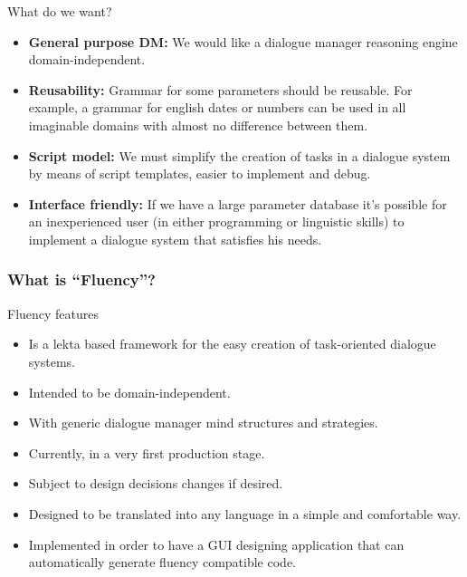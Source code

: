 \documentclass[11pt]{beamer}
\begin{document}
\begin{frame}
	\begin{block}{What do we want?}
			\begin{itemize}
				\item \textbf{General purpose DM:} We would like a dialogue manager reasoning engine domain-independent.
				\item \textbf{Reusability:} Grammar for some parameters should be reusable. For example, a grammar for english dates or numbers can be used in all imaginable domains with almost no difference between them.
				\item \textbf{Script model:} We must simplify the creation of tasks in a dialogue system by means of script templates, easier to implement and debug.
				\item \textbf{Interface friendly:} If we have a large parameter database it's possible for an inexperienced user (in either programming or linguistic skills) to implement a dialogue system that satisfies his needs.
			\end{itemize}
	\end{block}
\end{frame}

\begin{frame}
\frametitle{What is ``Fluency''?}
	\begin{block}{Fluency features}
			\begin{itemize}
				\item Is a lekta based framework for the easy creation of task-oriented dialogue systems.
				\item Intended to be domain-independent.
				\item With generic dialogue manager mind structures and strategies.
				\item Currently, in a very first production stage.
				\item Subject to design decisions changes if desired.
				\item Designed to be translated into any language in a simple and comfortable way.
				\item Implemented in order to have a GUI designing application that can automatically generate fluency compatible code.
			\end{itemize}
	\end{block}
\end{frame}
\end{document}
